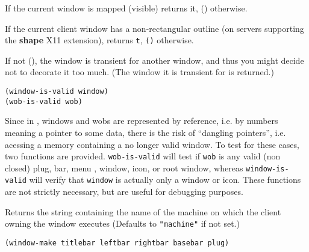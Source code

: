 
If the current window is mapped (visible) returns it, () otherwise.

        

If the current client window has a non-rectangular outline (on servers
supporting the {\bf shape} X11 extension), returns \verb"t", \verb"()"
otherwise.

        

If not (), the window is transient for another window, and thus you might
decide not to decorate it too much. (The window it is transient for is
returned.)


{\usagefont\begin{verbatim}
(window-is-valid window)
(wob-is-valid wob)
\end{verbatim}}\usageupspace

Since in {\GWM}, windows and wobs are represented by reference, i.e. by
numbers meaning a pointer to some data, there is the risk of ``dangling
pointers'', i.e. acessing a memory containing a no longer valid window. To
test for these cases, two functions are provided. \verb|wob-is-valid| will
test if \verb|wob| is any valid (non closed) plug, bar, menu , window, icon,
or root window, whereas \verb|window-is-valid| will verify that \verb|window|
is actually only a window or icon. These functions are not strictly necessary,
but are useful for debugging purposes.

        

Returns the string containing the name of the machine on which the client
owning the window executes (Defaults to \verb|"machine"| if not set.)

        
{\usagefont\begin{verbatim}
(window-make titlebar leftbar rightbar basebar plug)
\end{verbatim}}\usageupspace

